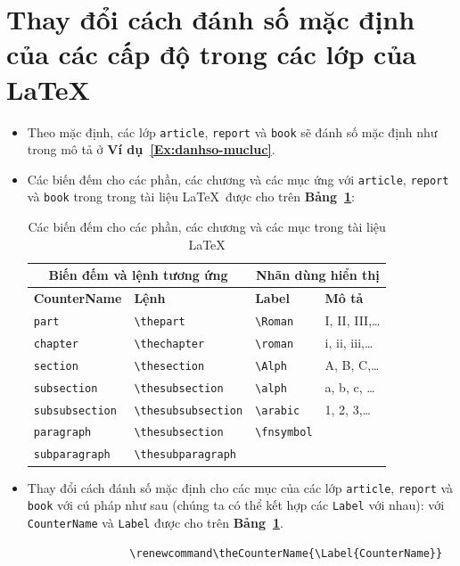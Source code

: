 \documentclass[12pt,a4paper]{article}
\newcommand{\tab}[1]{\textbf{Bảng~#1}}
\newcommand{\ex}[1]{\textbf{Ví dụ~#1}}
\newcommand{\head}[1]{\textbf{#1}}
\begin{document}
\section{Thay đổi cách đánh số mặc định của các cấp độ trong các lớp của \LaTeX}
	\begin{itemize}
		\item Theo mặc định, các lớp \Verb|article|, \Verb|report| và \Verb|book| sẽ đánh số mặc định như trong mô tả ở \ex{\ref{Ex:danhso-mucluc}}.
		
		\item Các biến đếm cho các phần, các chương và các mục ứng với \Verb|article|, \Verb|report| và \Verb|book| trong trong tài liệu \LaTeX\ được cho trên \tab{\ref{Tab:biendem-cautruc}}:
			\begin{table}[h]
				\begin{center}
					\begin{tabular}{llll}\toprule
					\multicolumn{2}{c}{\head{Biến đếm và lệnh tương ứng}} & \multicolumn{2}{c}{\head{Nhãn dùng hiển thị}} \\ \midrule
					\head{CounterName} & \head{Lệnh} & \head{Label} & \head{Mô tả} \\ \midrule
					\Verb|part| & \Verb|\thepart| & \Verb|\Roman| & I, II, III,\ldots\\ \midrule
					\Verb|chapter| & \Verb|\thechapter| & \Verb|\roman| & i, ii, iii,\ldots\\ \midrule
					\Verb|section| & \Verb|\thesection| & \Verb|\Alph| & A, B, C,\ldots \\ \midrule
					\Verb|subsection| & \Verb|\thesubsection| & \Verb|\alph| & a, b, c, \ldots \\ \midrule
					\Verb|subsubsection| & \Verb|\thesubsubsection| & \Verb|\arabic| & 1, 2, 3,\ldots \\ \midrule
					\Verb|paragraph| & \Verb|\thesubsection| & \Verb|\fnsymbol| & \\ \midrule
					\Verb|subparagraph| & \Verb|\thesubparagraph| &  & \\ \bottomrule
					\end{tabular}
				\end{center}
				\caption{Các biến đếm cho các phần, các chương và các mục trong tài liệu \LaTeX} \label{Tab:biendem-cautruc}
			\end{table}
		
		\item Thay đổi cách đánh số mặc định cho các mục của các lớp \Verb|article|, \Verb|report| và \Verb|book| với cú pháp như sau (chúng ta có thể kết hợp các \Verb|Label| với nhau): với \Verb|CounterName| và \Verb|Label| được cho trên \tab{\ref{Tab:biendem-cautruc}}.
			\begin{verbatim}
				\renewcommand\theCounterName{\Label{CounterName}}
			\end{verbatim}			
		

\end{itemize}
\end{document}
